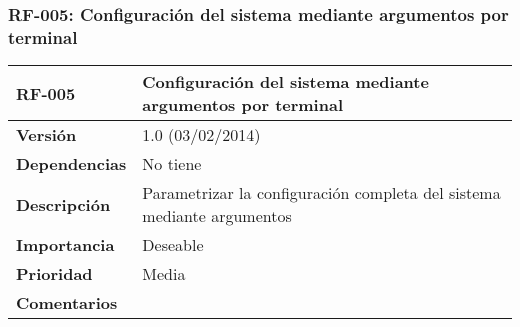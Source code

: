 \subsubsection*{RF-005: Configuración del sistema mediante argumentos por terminal}
\begin{tabular}{|p{3cm}|p{11.5cm}|}
\hline
\textbf{RF-005}         & \textbf{Configuración del sistema mediante argumentos por terminal}                                       \\ \hline
\textbf{Versión}        & 1.0 (03/02/2014)                                                                                           \\ \hline
\textbf{Dependencias}   & No tiene                                                                                                   \\ \hline
\textbf{Descripción}    & Parametrizar la configuración completa del sistema mediante argumentos                                     \\ \hline
\textbf{Importancia}    & Deseable                                                                                                   \\ \hline
\textbf{Prioridad}      & Media                                                                                                      \\ \hline
\textbf{Comentarios}    &                                                                                                            \\ \hline
\end{tabular}

